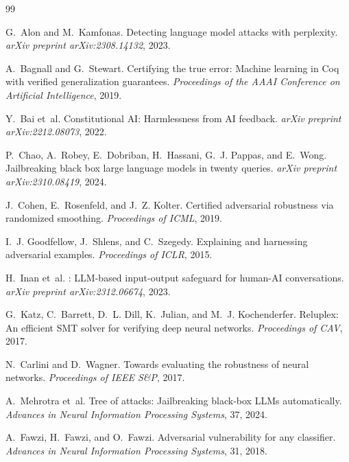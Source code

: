 \documentclass[11pt]{article}
\begin{document}

\begin{thebibliography}{99}

G.~Alon and M.~Kamfonas.
\newblock Detecting language model attacks with perplexity.
\newblock \emph{arXiv preprint arXiv:2308.14132}, 2023.

A.~Bagnall and G.~Stewart.
\newblock Certifying the true error: Machine learning in {Coq} with
  verified generalization guarantees.
\newblock \emph{Proceedings of the AAAI Conference on Artificial
Intelligence}, 2019.

Y.~Bai et~al.
\newblock Constitutional {AI}: Harmlessness from {AI} feedback.
\newblock \emph{arXiv preprint arXiv:2212.08073}, 2022.

P.~Chao, A.~Robey, E.~Dobriban, H.~Hassani, G.~J. Pappas, and
E.~Wong.
\newblock Jailbreaking black box large language models in twenty queries.
\newblock \emph{arXiv preprint arXiv:2310.08419}, 2024.

J.~Cohen, E.~Rosenfeld, and J.~Z. Kolter.
\newblock Certified adversarial robustness via randomized smoothing.
\newblock \emph{Proceedings of ICML}, 2019.

I.~J. Goodfellow, J.~Shlens, and C.~Szegedy.
\newblock Explaining and harnessing adversarial examples.
\newblock \emph{Proceedings of ICLR}, 2015.

H.~Inan et~al.
: {LLM}-based input-output safeguard for
  human-{AI} conversations.
\newblock \emph{arXiv preprint arXiv:2312.06674}, 2023.

G.~Katz, C.~Barrett, D.~L. Dill, K.~Julian, and
M.~J. Kochenderfer.
\newblock Reluplex: An efficient {SMT} solver for verifying deep neural
  networks.
\newblock \emph{Proceedings of CAV}, 2017.

N.~Carlini and D.~Wagner.
\newblock Towards evaluating the robustness of neural networks.
\newblock \emph{Proceedings of IEEE S\&P}, 2017.

A.~Mehrotra et~al.
\newblock Tree of attacks: Jailbreaking black-box {LLMs} automatically.
\newblock \emph{Advances in Neural Information Processing Systems}, 37,
2024.

A.~Fawzi, H.~Fawzi, and O.~Fawzi.
\newblock Adversarial vulnerability for any classifier.
\newblock \emph{Advances in Neural Information Processing Systems}, 31, 2018.


\end{thebibliography}
\end{document}
